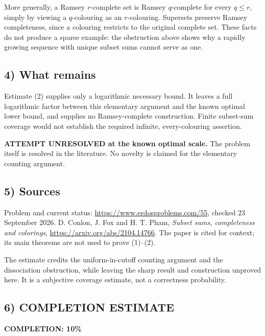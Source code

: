 More generally, a Ramsey $r$-complete set is Ramsey $q$-complete for every $q\le r$, simply by viewing a $q$-colouring as an $r$-colouring. Supersets preserve Ramsey completeness, since a colouring restricts to the original complete set. These facts do not produce a sparse example: the obstruction above shows why a rapidly growing sequence with unique subset sums cannot serve as one.

\subsection*{4) What remains}
Estimate (2) supplies only a logarithmic necessary bound. It leaves a full logarithmic factor between this elementary argument and the known optimal lower bound, and supplies no Ramsey-complete construction. Finite subset-sum coverage would not establish the required infinite, every-colouring assertion.

\textbf{ATTEMPT UNRESOLVED at the known optimal scale.} The problem itself is resolved in the literature. No novelty is claimed for the elementary counting argument.

\subsection*{5) Sources}
Problem and current status: \url{https://www.erdosproblems.com/55}, checked 23 September 2026. D. Conlon, J. Fox and H. T. Pham, \emph{Subset sums, completeness and colorings}, \url{https://arxiv.org/abs/2104.14766}. The paper is cited for context; its main theorems are not used to prove (1)--(2).

The estimate credits the uniform-in-cutoff counting argument and the dissociation obstruction, while leaving the sharp result and construction unproved here. It is a subjective coverage estimate, not a correctness probability.
\subsection*{6) COMPLETION ESTIMATE}
\textbf{COMPLETION: 10\%}
